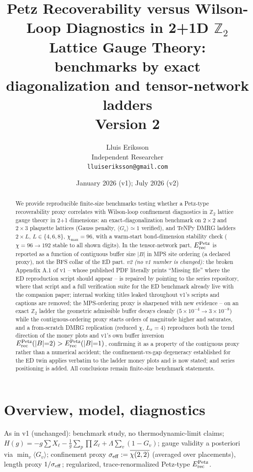 \documentclass[11pt]{article}
\title{Petz Recoverability versus Wilson-Loop Diagnostics in 2+1D
$\mathbb{Z}_2$ Lattice Gauge Theory:\\
{\large benchmarks by exact diagonalization and tensor-network ladders}\\
{\normalsize Version 2}}
\author{Lluis Eriksson\\ Independent Researcher\\ \texttt{lluiseriksson@gmail.com}}
\date{January 2026 (v1); July 2026 (v2)}
\theoremstyle{remark}
\newcommand{\Erec}{E^{\rm Petz}_{\rm rec}}
\begin{document}
\maketitle

\begin{abstract}
We provide reproducible finite-size benchmarks testing whether a
Petz-type recoverability proxy correlates with Wilson-loop confinement
diagnostics in $\mathbb{Z}_2$ lattice gauge theory in 2+1 dimensions: an
exact-diagonalization benchmark on $2\times2$ and $2\times3$ plaquette
lattices (Gauss penalty, $\langle G_v\rangle \simeq 1$ verified), and
TeNPy DMRG ladders $2\times L$, $L \in \{4, 6, 8\}$, $\chi_{\max} = 96$,
with a warm-start bond-dimension stability check ($\chi = 96 \to 192$
stable to all shown digits). In the tensor-network part, $\Erec$ is
reported as a function of contiguous buffer size $|B|$ in MPS site
ordering (a declared proxy), not the BFS collar of the ED part.
\emph{v2 (no v1 number is changed):} the broken Appendix A.1 of v1 --
whose published PDF literally prints ``Missing file'' where the ED
reproduction script should appear -- is repaired by pointing to the
series repository, where that script and a full verification suite for
the ED benchmark already live with the companion paper; internal working
titles leaked throughout v1's scripts and captions are removed; the
MPS-ordering proxy is sharpened with new evidence -- on an exact
$\mathbb{Z}_2$ ladder the geometric admissible buffer decays cleanly
($5\times10^{-4} \to 3\times10^{-8}$) while the contiguous-ordering proxy
starts orders of magnitude higher and saturates, and a from-scratch DMRG
replication (reduced $\chi$, $L_x = 4$) reproduces both the trend
direction of the money plots and v1's own buffer inversion
$\Erec(|B|{=}2) > \Erec(|B|{=}1)$, confirming it as a property of the
contiguous proxy rather than a numerical accident; the
confinement-vs-gap degeneracy established for the ED twin applies
verbatim to the ladder money plots and is now stated; and series
positioning is added. All conclusions remain finite-size benchmark
statements.
\end{abstract}

\section{Overview, model, diagnostics}
As in v1 (unchanged): benchmark study, no thermodynamic-limit claims;
$H(g) = -g\sum X_\ell - \tfrac1g\sum_p \prod Z_\ell + \Lambda\sum_v(1 -
G_v)$; gauge validity a posteriori via $\min_v\langle G_v\rangle$;
confinement proxy $\sigma_{\rm eff} := \overline{\chi(2,2)}$ (averaged
over placements), length proxy $1/\sigma_{\rm eff}$; regularized,
trace-renormalized Petz-type $\Erec$.
\end{document}
